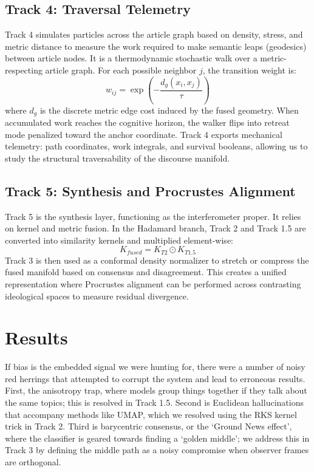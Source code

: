 \subsection{Track 4: Traversal Telemetry}

Track 4 simulates particles across the article graph based on density, stress, and metric distance to measure the work required to make semantic leaps (geodesics) between article nodes. It is a thermodynamic stochastic walk over a metric-respecting article graph. For each possible neighbor $j$, the transition weight is:
\begin{equation}
w_{ij} = \exp\left(-\frac{d_g(x_i,x_j)}{\tau}\right)
\end{equation}
where $d_g$ is the discrete metric edge cost induced by the fused geometry. When accumulated work reaches the cognitive horizon, the walker flips into retreat mode penalized toward the anchor coordinate. Track 4 exports mechanical telemetry: path coordinates, work integrals, and survival booleans, allowing us to study the structural traversability of the discourse manifold.

\subsection{Track 5: Synthesis and Procrustes Alignment}

Track 5 is the synthesis layer, functioning as the interferometer proper. It relies on kernel and metric fusion. In the Hadamard branch, Track 2 and Track 1.5 are converted into similarity kernels and multiplied element-wise:
\begin{equation}
K_{fused} = K_{T2} \odot K_{T1.5}
\end{equation}
Track 3 is then used as a conformal density normalizer to stretch or compress the fused manifold based on consensus and disagreement. This creates a unified representation where Procrustes alignment can be performed across contrasting ideological spaces to measure residual divergence.




\section{Results}

If bias is the embedded signal we were hunting for, there were a number of noisy red herrings that attempted to corrupt the system and lead to erroneous results. First, the anisotropy trap, where models group things together if they talk about the same topics; this is resolved in Track 1.5. Second is Euclidean hallucinations that accompany methods like UMAP, which we resolved using the RKS kernel trick in Track 2. Third is barycentric consensus, or the `Ground News effect', where the classifier is geared towards finding a `golden middle'; we address this in Track 3 by defining the middle path as a noisy compromise when observer frames are orthogonal.

